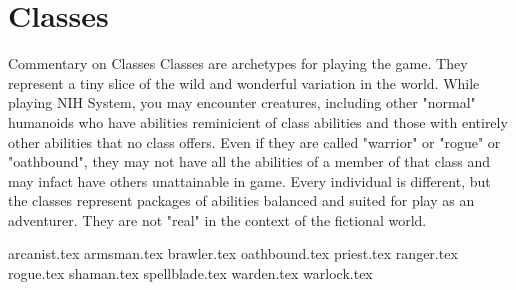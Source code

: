 \chapter{Classes}
\label{ch:classes}

\begin{DndComment}{Commentary on Classes}
Classes are archetypes for playing the game. They represent a tiny slice of the wild and wonderful variation in the world. While playing NIH System, you may encounter creatures, including other "normal" humanoids who have abilities reminicient of class abilities and those with entirely other abilities that no class offers. Even if they are called "warrior" or "rogue" or "oathbound", they may not have all the abilities of a member of that class and may infact have others unattainable in game. Every individual is different, but the classes represent packages of abilities balanced and suited for play as an adventurer. They are not "real" in the context of the fictional world.
\end{DndComment}

{arcanist.tex}
{armsman.tex}
{brawler.tex}
{oathbound.tex}
{priest.tex}
{ranger.tex}
{rogue.tex}
{shaman.tex}
{spellblade.tex}
{warden.tex}
{warlock.tex}

